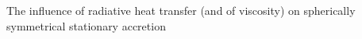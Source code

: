 \documentclass[main.tex]{subfiles}
\begin{document}
The influence of radiative heat transfer (and of viscosity) on spherically symmetrical stationary accretion
\end{document}
